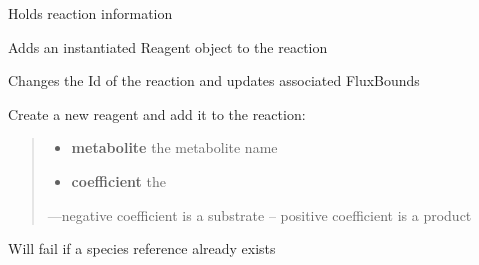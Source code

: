 \documentclass[a4paper,11pt,english]{sphinxmanual}
\begin{document}

\begin{fulllineitems}
\label{modules_doc:cbmpy.CBModel.Reaction}
Holds reaction information

\begin{fulllineitems}
\label{modules_doc:cbmpy.CBModel.Reaction.addReagent}
Adds an instantiated Reagent object to the reaction

\end{fulllineitems}


\begin{fulllineitems}
\label{modules_doc:cbmpy.CBModel.Reaction.changeId}
Changes the Id of the reaction and updates associated FluxBounds

\end{fulllineitems}


\begin{fulllineitems}
\label{modules_doc:cbmpy.CBModel.Reaction.createReagent}
Create a new reagent and add it to the reaction:
\begin{quote}
\begin{itemize}
\item {} 
\textbf{metabolite} the metabolite name

\item {} 
\textbf{coefficient} the

\end{itemize}

\begin{flushright}
---negative coefficient is a substrate
-- positive coefficient is a product
\end{flushright}
\end{quote}

Will fail if a species reference already exists

\end{fulllineitems}


\end{fulllineitems}
\end{document}
